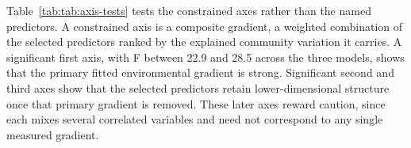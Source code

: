 \documentclass[11pt]{article}
\begin{document}
Table~\ref{tab:tab:axis-tests} tests the constrained axes rather than the named predictors. A constrained axis is a composite gradient, a weighted combination of the selected predictors ranked by the explained community variation it carries. A significant first axis, with F between 22.9 and 28.5 across the three models, shows that the primary fitted environmental gradient is strong. Significant second and third axes show that the selected predictors retain lower-dimensional structure once that primary gradient is removed. These later axes reward caution, since each mixes several correlated variables and need not correspond to any single measured gradient.
\begin{table}[!h]
\centering
\caption{\label{tab:tab:axis-tests}Permutation tests for constrained axes.}
\centering
{}
\end{table}
\end{document}

